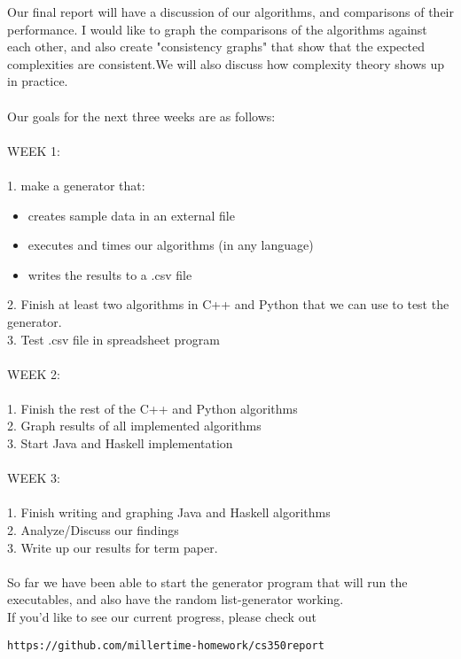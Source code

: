 \documentclass[12pt]{amsart}
\begin{document}
Our final report will have a discussion of our algorithms, and comparisons of their performance. I would like to 
graph the comparisons of the algorithms against each other, and also create "consistency graphs" that show that
the expected complexities are consistent.We will also discuss how complexity theory shows up in practice.\\ \\
Our goals for the next three weeks are as follows:\\ \\
WEEK 1:\\ \\
1. make a generator that:
\begin{itemize}
\item creates sample data in an external file
\item executes and times our algorithms (in any language)
\item writes the results to a .csv file\\
\end{itemize}
2. Finish at least two algorithms in C++ and Python that we can use to test the generator. \\
3. Test .csv file in spreadsheet program\\ \\
WEEK 2:\\ \\
1. Finish the rest of the C++ and Python algorithms\\ 
2. Graph results of all implemented algorithms\\
3. Start Java and Haskell implementation\\ \\
WEEK 3:\\ \\
1. Finish writing and graphing Java and Haskell algorithms\\
2. Analyze/Discuss our findings\\
3. Write up our results for term paper.\\
\\
So far we have been able to start the generator program that will run the executables, and also
have the random list-generator working.\\
If you'd like to see our current progress, 
please check out 
\begin{verbatim}
https://github.com/millertime-homework/cs350report
\end{verbatim}
\end{document}
